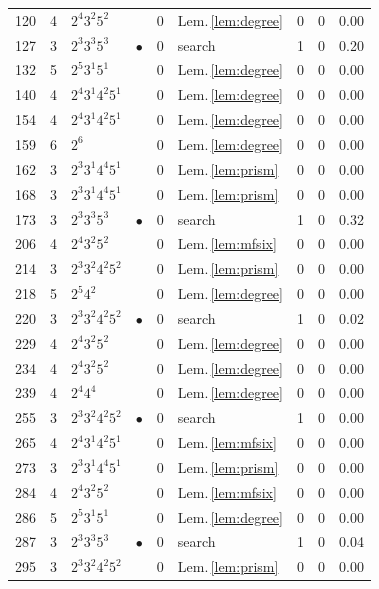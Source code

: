 \documentclass[11pt,reqno]{amsart}
\theoremstyle{plain}
\theoremstyle{definition}
\begin{document}
{\begin{longtable}{r r l c c l r r r}
120 & 4 & $2^{4}3^{2}5^{2}$ &  & 0 & Lem.\,\ref{lem:degree} & 0 & 0 & 0.00 \\
127 & 3 & $2^{3}3^{3}5^{3}$ & $\bullet$ & 0 & search & 1 & 0 & 0.20 \\
132 & 5 & $2^{5}3^{1}5^{1}$ &  & 0 & Lem.\,\ref{lem:degree} & 0 & 0 & 0.00 \\
140 & 4 & $2^{4}3^{1}4^{2}5^{1}$ &  & 0 & Lem.\,\ref{lem:degree} & 0 & 0 & 0.00 \\
154 & 4 & $2^{4}3^{1}4^{2}5^{1}$ &  & 0 & Lem.\,\ref{lem:degree} & 0 & 0 & 0.00 \\
159 & 6 & $2^{6}$ &  & 0 & Lem.\,\ref{lem:degree} & 0 & 0 & 0.00 \\
162 & 3 & $2^{3}3^{1}4^{4}5^{1}$ &  & 0 & Lem.\,\ref{lem:prism} & 0 & 0 & 0.00 \\
168 & 3 & $2^{3}3^{1}4^{4}5^{1}$ &  & 0 & Lem.\,\ref{lem:prism} & 0 & 0 & 0.00 \\
173 & 3 & $2^{3}3^{3}5^{3}$ & $\bullet$ & 0 & search & 1 & 0 & 0.32 \\
206 & 4 & $2^{4}3^{2}5^{2}$ &  & 0 & Lem.\,\ref{lem:mfsix} & 0 & 0 & 0.00 \\
214 & 3 & $2^{3}3^{2}4^{2}5^{2}$ &  & 0 & Lem.\,\ref{lem:prism} & 0 & 0 & 0.00 \\
218 & 5 & $2^{5}4^{2}$ &  & 0 & Lem.\,\ref{lem:degree} & 0 & 0 & 0.00 \\
220 & 3 & $2^{3}3^{2}4^{2}5^{2}$ & $\bullet$ & 0 & search & 1 & 0 & 0.02 \\
229 & 4 & $2^{4}3^{2}5^{2}$ &  & 0 & Lem.\,\ref{lem:degree} & 0 & 0 & 0.00 \\
234 & 4 & $2^{4}3^{2}5^{2}$ &  & 0 & Lem.\,\ref{lem:degree} & 0 & 0 & 0.00 \\
239 & 4 & $2^{4}4^{4}$ &  & 0 & Lem.\,\ref{lem:degree} & 0 & 0 & 0.00 \\
255 & 3 & $2^{3}3^{2}4^{2}5^{2}$ & $\bullet$ & 0 & search & 1 & 0 & 0.00 \\
265 & 4 & $2^{4}3^{1}4^{2}5^{1}$ &  & 0 & Lem.\,\ref{lem:mfsix} & 0 & 0 & 0.00 \\
273 & 3 & $2^{3}3^{1}4^{4}5^{1}$ &  & 0 & Lem.\,\ref{lem:prism} & 0 & 0 & 0.00 \\
284 & 4 & $2^{4}3^{2}5^{2}$ &  & 0 & Lem.\,\ref{lem:mfsix} & 0 & 0 & 0.00 \\
286 & 5 & $2^{5}3^{1}5^{1}$ &  & 0 & Lem.\,\ref{lem:degree} & 0 & 0 & 0.00 \\
287 & 3 & $2^{3}3^{3}5^{3}$ & $\bullet$ & 0 & search & 1 & 0 & 0.04 \\
295 & 3 & $2^{3}3^{2}4^{2}5^{2}$ &  & 0 & Lem.\,\ref{lem:prism} & 0 & 0 & 0.00 \\

\end{longtable}}
\end{document}
